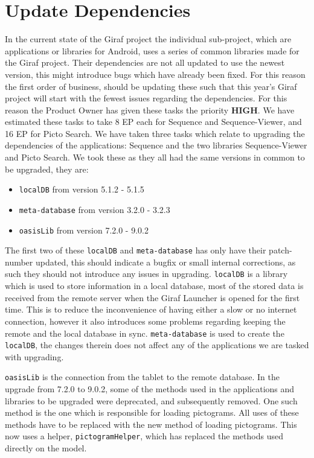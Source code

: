 \section{Update Dependencies} 
In the current state of the Giraf project the individual sub-project, which are applications or libraries for Android, uses a series of common libraries made for the Giraf project. 
Their dependencies are not all updated to use the newest version, this might introduce bugs which have already been fixed. 
For this reason the first order of business, should be updating these such that this year's Giraf project will start with the fewest issues regarding the dependencies. 
For this reason the Product Owner has given these tasks the priority \textbf{HIGH}. 
We have estimated these tasks to take 8 EP each for Sequence and Sequence-Viewer, and 16 EP for Picto Search. 
We have taken three tasks which relate to upgrading the dependencies of the applications: Sequence and the two libraries Sequence-Viewer and Picto Search. 
We took these as they all had the same versions in common to be upgraded, they are: 
\begin{itemize} 
    \item \texttt{localDB} from version 5.1.2 - 5.1.5 
    \item \texttt{meta-database} from version 3.2.0 - 3.2.3 
    \item \texttt{oasisLib} from version 7.2.0 - 9.0.2 
\end{itemize} 
The first two of these \texttt{localDB} and \texttt{meta-database} has only have their patch-number updated, this should indicate a bugfix or small internal corrections, as such they should not introduce any issues in upgrading. 
\texttt{localDB} is a library which is used to store information in a local database, most of the stored data is received from the remote server when the Giraf Launcher is opened for the first time. 
This is to reduce the inconvenience of having either a slow or no internet connection, however it also introduces some problems regarding keeping the remote and the local database in sync. 
\texttt{meta-database} is used to create the \texttt{localDB}, the changes therein does not affect any of the applications we are tasked with upgrading. 
  
\texttt{oasisLib} is the connection from the tablet to the remote database. 
In the upgrade from 7.2.0 to 9.0.2, some of the methods used in the applications and libraries to be upgraded were deprecated, and subsequently removed. 
One such method is the one which is responsible for loading pictograms. 
All uses of these methods have to be replaced with the new method of loading pictograms. 
This now uses a helper, \texttt{pictogramHelper}, which has replaced the methods used directly on the model. 
  
